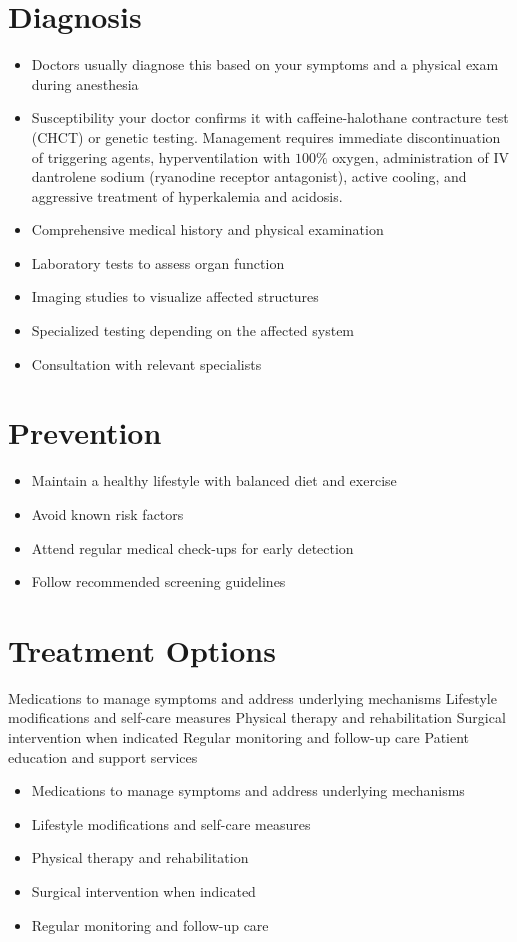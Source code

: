 \section{Diagnosis}
\begin{itemize}[noitemsep]
  \item Doctors usually diagnose this based on your symptoms and a physical exam during anesthesia
  \item Susceptibility your doctor confirms it with caffeine-halothane contracture test (CHCT) or genetic testing. Management requires immediate discontinuation of triggering agents, hyperventilation with $100\%$ oxygen, administration of IV dantrolene sodium (ryanodine receptor antagonist), active cooling, and aggressive treatment of hyperkalemia and acidosis.
  \item Comprehensive medical history and physical examination
  \item Laboratory tests to assess organ function
  \item Imaging studies to visualize affected structures
  \item Specialized testing depending on the affected system
  \item Consultation with relevant specialists
\end{itemize}
\section{Prevention}
\begin{itemize}[noitemsep]
  \item Maintain a healthy lifestyle with balanced diet and exercise
  \item Avoid known risk factors
  \item Attend regular medical check-ups for early detection
  \item Follow recommended screening guidelines
\end{itemize}
\section{Treatment Options}
Medications to manage symptoms and address underlying mechanisms Lifestyle modifications and self-care measures Physical therapy and rehabilitation Surgical intervention when indicated Regular monitoring and follow-up care Patient education and support services

\begin{itemize}[noitemsep]
  \item Medications to manage symptoms and address underlying mechanisms
  \item Lifestyle modifications and self-care measures
  \item Physical therapy and rehabilitation
  \item Surgical intervention when indicated
  \item Regular monitoring and follow-up care
\end{itemize}
